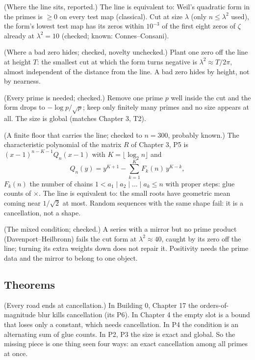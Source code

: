 \begin{lines}
\item[\lab{P1}] (Where the line sits, reported.) The line is equivalent to: Weil's quadratic form in the primes is $\ge 0$ on every test map (classical). Cut at size $\lambda$ (only $n \le \lambda^2$ used), the form's lowest test map has its zeros within $10^{-3}$ of the first eight zeros of $\zeta$ already at $\lambda^2 = 10$ (checked; known: Connes--Consani).
\item[\lab{P2}] (Where a bad zero hides; checked, novelty unchecked.) Plant one zero off the line at height $T$: the smallest cut at which the form turns negative is $\lambda^2 \approx T/2\pi$, almost independent of the distance from the line. A bad zero hides by height, not by nearness.
\item[\lab{P3}] (Every prime is needed; checked.) Remove one prime $p$ well inside the cut and the form drops to $-\log p / \sqrt p$; keep only finitely many primes and no size appears at all. The size is global (matches Chapter 3, T2).
\item[\lab{P4}] (A finite floor that carries the line; checked to $n = 300$, probably known.) The characteristic polynomial of the matrix $R$ of Chapter 3, P5 is $(x - 1)^{n - K - 1} Q_n(x - 1)$ with $K = \lfloor \log_2 n \rfloor$ and \[ Q_n(y) = y^{K+1} - \sum_{k=1}^{K} F_k(n)\, y^{K - k}, \] $F_k(n)$ the number of chains $1 < a_1 \mid a_2 \mid \dots \mid a_k \le n$ with proper steps: glue counts of $\times$. The line is equivalent to: the small roots have geometric mean coming near $1/\sqrt2$ at most. Random sequences with the same shape fail: it is a cancellation, not a shape.
\item[\lab{P5}] (The mixed condition; checked.) A series with a mirror but no prime product (Davenport--Heilbronn) fails the cut form at $\lambda^2 \approx 40$, caught by its zero off the line; turning its extra weights down does not repair it. Positivity needs the prime data and the mirror to belong to one object.
\end{lines}

\subsection*{Theorems}

\begin{lines}
\item[\lab{T1}] (Every road ends at cancellation.) In Building 0, Chapter 17 the orders-of-magnitude blur kills cancellation (its P6). In Chapter 4 the empty slot is a bound that loses only a constant, which needs cancellation. In P4 the condition is an alternating sum of glue counts. In P2, P3 the size is exact and global. So the missing piece is one thing seen four ways: an exact cancellation among all primes at once.
\end{lines}

